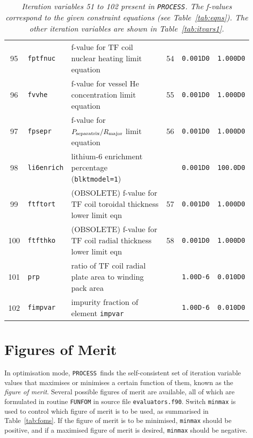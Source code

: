 \documentclass[11pt,a4paper]{report}
\newcommand{\process}{\mbox{\texttt{PROCESS}}}
\begin{document}
\begin{table}[tbph]
\begin{center}
\begin{tabular}{||c|l|l|c|c|c||}
95  & \texttt{fptfnuc}  & f-value for TF coil nuclear heating limit equation      & 54  & \texttt{0.001D0} & \texttt{1.000D0} \\
96  & \texttt{fvvhe}    & f-value for vessel He concentration limit equation      & 55  & \texttt{0.001D0} & \texttt{1.000D0} \\
97  & \texttt{fpsepr}   & f-value for $P_{\mbox{\scriptsize separatrix}}/R_{\mbox{\scriptsize major}}$ limit equation & 56
  & \texttt{0.001D0} & \texttt{1.000D0} \\
98  & \texttt{li6enrich}& lithium-6 enrichment percentage (\texttt{blktmodel=1})  &     & \texttt{0.001D0} & \texttt{100.0D0} \\
99  & \texttt{ftftort}  & (OBSOLETE) f-value for TF coil toroidal thickness lower limit eqn  & 57  & \texttt{0.001D0} & \texttt{1.000D0} \\
100 & \texttt{ftfthko}  & (OBSOLETE) f-value for TF coil radial thickness lower limit eqn    & 58  & \texttt{0.001D0} & \texttt{1.000D0} \\
101 & \texttt{prp}      & ratio of TF coil radial plate area to winding pack area &     & \texttt{1.00D-6} & \texttt{0.010D0} \\
102 & \texttt{fimpvar}  & impurity fraction of element \texttt{impvar}            &     & \texttt{1.00D-6} & \texttt{0.010D0} \\
\hline
\end{tabular}
\end{center}
\caption[List of iteration variables 51 to 102]
{\label{tab:itvars2}
  \textit{Iteration variables 51 to 102 present in \process. The f-values correspond to the
    given constraint equations (see Table~\ref{tab:eqns}). The other iteration
    variables are shown in Table~\ref{tab:itvars1}.}
}
\end{table}
\normalsize


\section{Figures of Merit}
\label{sec:foms}

In optimisation mode, \process\ finds the self-consistent set of iteration
variable values that maximises or minimises a certain function of them, known
as the \textit{figure of merit}. Several possible figures of merit are
available, all of which are formulated in routine \texttt{FUNFOM} in source
file \texttt{evaluators.f90}.  Switch \texttt{minmax} is used to control which
figure of merit is to be used, as summarised in Table~\ref{tab:foms}. If the
figure of merit is to be minimised, \texttt{minmax} should be positive, and if
a maximised figure of merit is desired, \texttt{minmax} should be negative.
\end{document}
